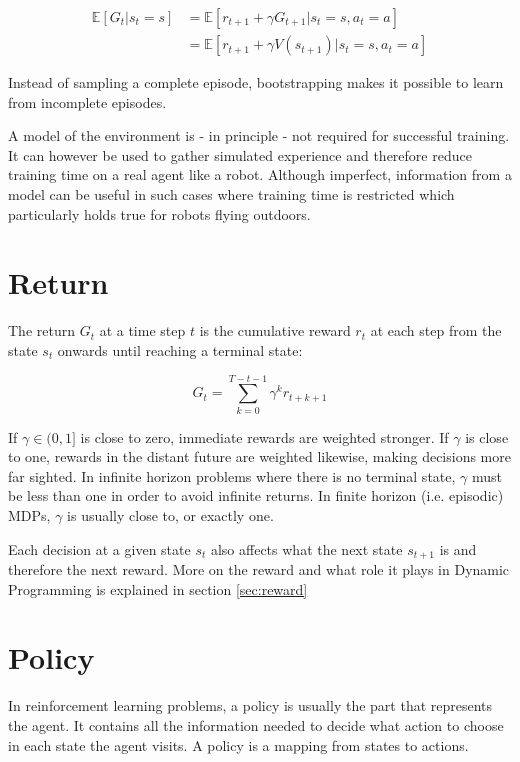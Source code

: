 \begin{align}
\mathbb{E}[G_t|s_t=s] &= \mathbb{E}[r_{t+1} + \gamma G_{t+1}|s_t=s, a_t=a] \\
&=\mathbb{E}[r_{t+1}+ \gamma V(s_{t+1})|s_t=s, a_t=a]
\end{align}

Instead of sampling a complete episode, bootstrapping makes it possible to learn from incomplete episodes.

A model of the environment is - in principle - not required for successful training. It can however be used to gather simulated experience and therefore reduce training time on a real agent like a robot. Although imperfect, information from a model can be useful in such cases where training time is restricted which particularly holds true for robots flying outdoors.

\section{Return}

The return $G_t$ at a time step $t$ is the cumulative reward $r_t$ at each step from the state $s_t$ onwards until reaching a terminal state:

\begin{equation}
G_t = \sum_{k=0}^{T-t-1}\gamma^k r_{t+k+1}
\end{equation}

If $\gamma \in (0,1]$ is close to zero, immediate rewards are weighted stronger. If $\gamma$ is close to one, rewards in the distant future are weighted likewise, making decisions more far sighted. In infinite horizon problems where there is no terminal state, $\gamma$ must be less than one in order to avoid infinite returns. In finite horizon (i.e. episodic) MDPs, $\gamma$ is usually close to, or exactly one.

Each decision at a given state $s_t$ also affects what the next state $s_{t+1}$ is and therefore the next reward. More on the reward and what role it plays in Dynamic Programming is explained in section \ref{sec:reward}

\section{Policy}
\label{sec:policy}
In reinforcement learning problems, a policy is usually the part that represents the agent. It contains all the information needed to decide what action to choose in each state the agent visits. A policy is a mapping from states to actions.

